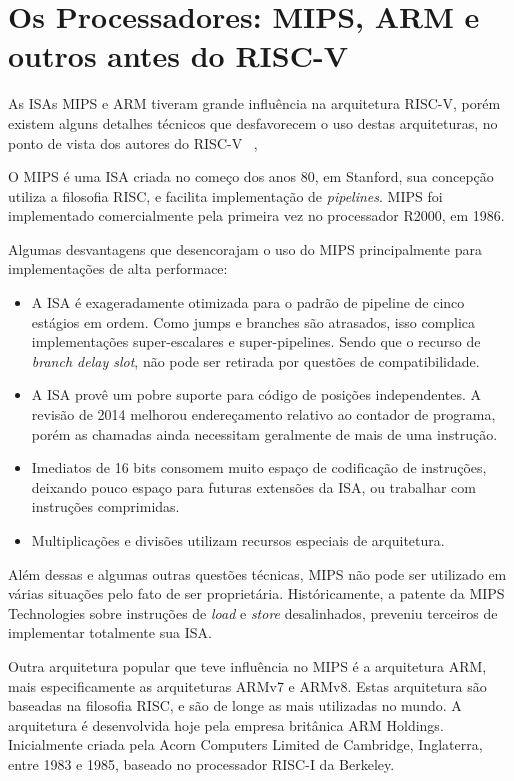 	\section{Os Processadores: MIPS, ARM e outros antes do RISC-V}

		As ISAs MIPS e ARM tiveram grande influência na arquitetura RISC-V, porém existem alguns detalhes técnicos que desfavorecem o uso destas arquiteturas, no ponto de vista dos autores do RISC-V ~\cite{Waterman:EECS-2016-1},

		O MIPS é uma ISA criada no começo dos anos 80, em Stanford, sua concepção utiliza a filosofia RISC, e facilita implementação de \textit{pipelines}. MIPS foi implementado comercialmente pela primeira vez no processador R2000, em 1986.

		Algumas desvantagens que desencorajam o uso do MIPS principalmente para implementações de alta performace:
		\begin{itemize}
			\item A ISA é exageradamente otimizada para o padrão de pipeline de cinco estágios em ordem. Como jumps e branches são atrasados, isso complica implementações super-escalares e super-pipelines. Sendo que o recurso de \textit{branch delay slot}, não pode ser retirada por questões de compatibilidade.

			\item A ISA provê um pobre suporte para código de posições independentes. A revisão de 2014 melhorou endereçamento relativo ao contador de programa, porém as chamadas ainda necessitam geralmente de mais de uma instrução.

			\item Imediatos de 16 bits consomem muito espaço de codificação de instruções, deixando pouco espaço para futuras extensões da ISA, ou trabalhar com instruções comprimidas.

			\item Multiplicações e divisões utilizam recursos especiais de arquitetura.
		\end{itemize}

		Além dessas e algumas outras questões técnicas, MIPS não pode ser utilizado em várias situações pelo fato de ser proprietária. Históricamente, a patente da MIPS Technologies sobre instruções de \textit{load} e \textit{store} desalinhados, preveniu terceiros de implementar totalmente sua ISA.

		Outra arquitetura popular que teve influência no MIPS é a arquitetura ARM, mais especificamente as arquiteturas ARMv7 e ARMv8. Estas arquitetura são baseadas na filosofia RISC, e são de longe as mais utilizadas no mundo. A arquitetura é desenvolvida hoje pela empresa britânica ARM Holdings. Inicialmente criada pela Acorn Computers Limited de Cambridge, Inglaterra, entre 1983 e 1985, baseado no processador RISC-I da Berkeley.

